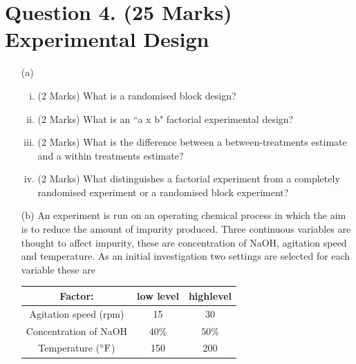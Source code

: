 \documentclass[a4paper,12pt]{article}
\begin{document}
\normalsize{
	
\newpage	

\section*{Question 4. (25 Marks) Experimental Design}
\begin{itemize}
	\item[(a)]
	
	\begin{enumerate}[(i)]
		
		\item (2 Marks) What is a randomised block design?
		\item (2 Marks) What is an ``a x b" factorial experimental design?
		\item (2 Marks)  What is the difference between a between-treatments estimate and a within treatments estimate?
		\item (2 Marks) What distinguishes a factorial experiment from a completely randomised experiment or a randomised block experiment?
		
		
	\end{enumerate}


		\item[(b)] 
		An experiment is run on an operating chemical process in which the aim is to reduce the
		amount of impurity produced. Three continuous variables are thought to affect impurity,
		these are concentration of NaOH, agitation speed and temperature. As an initial investigation two settings are selected for each variable these are
		
\begin{center}
	\begin{tabular}{|c|c|c|}
		\hline
		Factor: &low level & highlevel  \\ \hline
		Agitation speed (rpm) & 15 & 30 \\
		Concentration of NaOH & $40\%$ & $50\%$\\
		
		Temperature ($^{\circ}{\rm F}$) & 150 & 200 \\
		\hline
	\end{tabular}
\end{center}




\end{itemize}}
\end{document}

